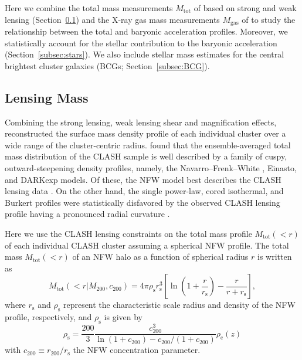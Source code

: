 \documentclass[a4paper,iop,twocolumn,twocolappendix,numberedappendix,appendixfloats]{emulateapj}
\newcommand{\Mtot}{M_\mathrm{tot}}
\newcommand{\Mgas}{M_\mathrm{gas}}
\begin{document}
Here we combine the total mass measurements $\Mtot$ of \citet{Umetsu16}
based on strong and weak lensing (Section~\ref{subsec:lens})
and the X-ray gas mass measurements $\Mgas$ of \citet{Donahue14}
to study the relationship
between the total and baryonic acceleration profiles.  Moreover, we
statistically account for the stellar contribution to the baryonic
acceleration (Section~\ref{subsec:stars}).  We also include stellar mass
estimates for the central brightest cluster galaxies (BCGs; Section~\ref{subsec:BCG}).


\subsection{Lensing Mass}
\label{subsec:lens}


Combining the strong lensing, weak lensing shear and magnification
effects, \citet{Umetsu16} reconstructed the surface mass density
profile of each individual cluster over a wide range of
the cluster-centric radius.
\citet{Umetsu16} found that
the ensemble-averaged total mass distribution of the CLASH sample is
well described by a family of cuspy, outward-steepening density
profiles, namely,
the Navarro--Frenk--White \citep[NFW, hereafater;][]{Navarro97}, Einasto,
and DARKexp \citep{DARKexp} models.
Of these, the NFW model best describes the CLASH lensing data
\citep[e.g.,][]{Umetsu11,Umetsu17}.
On the other hand, the single power-law, cored isothermal, and Burkert
profiles were statistically disfavored by the observed CLASH lensing
profile having a pronounced radial curvature \citep{Umetsu16}.

Here we use the CLASH lensing
constraints on the total mass profile $\Mtot(<r)$ of each individual
CLASH cluster assuming a spherical NFW profile. The total mass
$\Mtot(<r)$ of an NFW halo as a function of spherical radius $r$ is
written as
\begin{equation}
 \Mtot(<r|M_{200},c_{200}) = 4\pi \rho_\mathrm{s} r_\mathrm{s}^3
  \left[\ln\left(1+\frac{r}{r_\mathrm{s}}\right)-\frac{r}{r+r_\mathrm{s}}\right],
\end{equation}
where $r_\mathrm{s}$ and $\rho_\mathrm{s}$ represent
the characteristic scale radius and density of the NFW profile,
respectively, and $\rho_\mathrm{s}$ is given by
\begin{equation}
 \rho_\mathrm{s} = \frac{200}{3}\frac{c_{200}^3}{\ln(1+c_{200})-c_{200}/(1+c_{200})}\rho_\mathrm{c}(z)
\end{equation}
with $c_{200}\equiv r_{200}/r_\mathrm{s}$ the NFW concentration
parameter.
\end{document}

